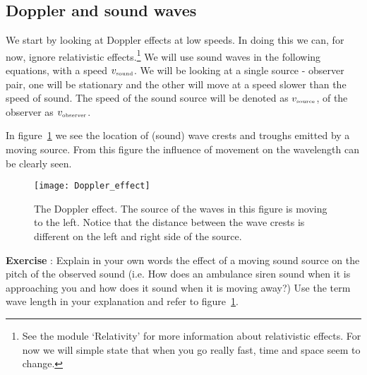 \subsection{Doppler and sound waves}
We start by looking at Doppler effects at low speeds. In doing this we can, for now, ignore relativistic effects.\footnote{See the module `Relativity' for more information about relativistic effects. For now we will simple state that when you go really fast, time and space seem to change.} We will use sound waves in the following equations, with a speed $v_{\mbox{\begin{tiny}sound\end{tiny}}}$. We will be looking at a single source - observer pair, one will be stationary and the other will move at a speed slower than the speed of sound. The speed of the sound source will be denoted as $v_{\mbox{\begin{tiny}source\end{tiny}}}$, of the observer as $v_{\mbox{\begin{tiny}observer\end{tiny}}}$. 

In figure~\ref{fig:doppler_1} we see the location of (sound) wave crests and troughs emitted by a moving source. From this figure the influence of movement on the wavelength can be clearly seen.
\begin{figure}[t]\begin{center}
\texttt{[image: Doppler\_effect]}%
\caption{The Doppler effect. The source of the waves in this figure is moving to the left. Notice that the distance between the wave crests is different on the left and right side of the source.}\label{fig:doppler_1}
\end{center}\end{figure}

\begin{shaded}
\textbf{Exercise \theExercise {}} : Explain in your own words the effect of a moving sound source on the pitch of the observed sound (i.e. How does an ambulance siren sound when it is approaching you and how does it sound when it is moving away?) Use the term wave length in your explanation and refer to figure~\ref{fig:doppler_1}.\end{shaded}

